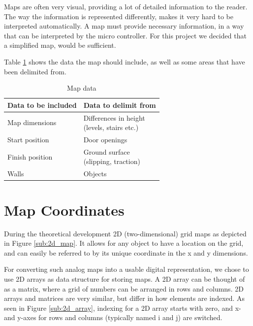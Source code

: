 Maps are often very visual, providing a lot of detailed information to the reader.
The way the information is represented differently,
makes it very hard to be interpreted automatically.
A map must provide necessary information,
in a way that can be interpreted by the micro controller.
For this project we decided that a simplified map, would be sufficient.

Table \ref{table:map_data} shows the data the map should include,
as well as some areas that have been delimited from.

\begin{table}[h!]
	\centering
	\caption{Map data}
	\begin{tabular}{|p{}||p{}|}
		\hline
		Data to be included & Data to delimit from \\ 
		\hline
		Map dimensions 		& \parbox[t]{0.4\textwidth}{Differences in height\\(levels, stairs etc.)}\\
		\hline
		Start position 		& Door openings \\
		\hline
		Finish position 	& \parbox[t]{0.4\textwidth}{Ground surface\\(slipping, traction)} \\
		\hline
		Walls 				& Objects\\
		\hline
	\end{tabular}
	\label{table:map_data}
\end{table}


\section{Map Coordinates}
\label{sec:map_coordinates} %

During the theoretical development 2D (two-dimensional) grid maps as depicted in Figure \ref{sub:2d_map}. It allows for any object to have a location on the grid, and can easily be referred to by its unique coordinate in the x and y dimensions. 

For converting such analog maps into a usable digital representation, we chose to use 2D arrays as data structure for storing maps. A 2D array can be thought of as a matrix, where a grid of numbers can be arranged in rows and columns. 2D arrays and matrices are very similar, but differ in how elements are indexed. As seen in Figure \ref{sub:2d_array}, indexing for a 2D array starts with zero, and x- and y-axes for rows and columns (typically named i and j) are switched.  

